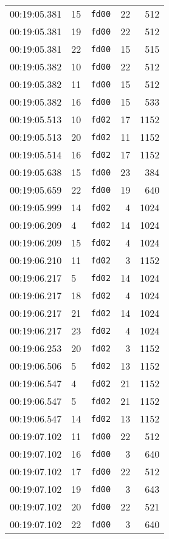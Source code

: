 \documentclass{article}
\begin{document}
\begin{longtable}{lllrr}
00:19:05.381 & 15 & \texttt{fd00} & 22 & 512 \\
00:19:05.381 & 19 & \texttt{fd00} & 22 & 512 \\
00:19:05.381 & 22 & \texttt{fd00} & 15 & 515 \\
00:19:05.382 & 10 & \texttt{fd00} & 22 & 512 \\
00:19:05.382 & 11 & \texttt{fd00} & 15 & 512 \\
00:19:05.382 & 16 & \texttt{fd00} & 15 & 533 \\
00:19:05.513 & 10 & \texttt{fd02} & 17 & 1152 \\
00:19:05.513 & 20 & \texttt{fd02} & 11 & 1152 \\
00:19:05.514 & 16 & \texttt{fd02} & 17 & 1152 \\
00:19:05.638 & 15 & \texttt{fd00} & 23 & 384 \\
00:19:05.659 & 22 & \texttt{fd00} & 19 & 640 \\
00:19:05.999 & 14 & \texttt{fd02} & 4 & 1024 \\
00:19:06.209 & 4 & \texttt{fd02} & 14 & 1024 \\
00:19:06.209 & 15 & \texttt{fd02} & 4 & 1024 \\
00:19:06.210 & 11 & \texttt{fd02} & 3 & 1152 \\
00:19:06.217 & 5 & \texttt{fd02} & 14 & 1024 \\
00:19:06.217 & 18 & \texttt{fd02} & 4 & 1024 \\
00:19:06.217 & 21 & \texttt{fd02} & 14 & 1024 \\
00:19:06.217 & 23 & \texttt{fd02} & 4 & 1024 \\
00:19:06.253 & 20 & \texttt{fd02} & 3 & 1152 \\
00:19:06.506 & 5 & \texttt{fd02} & 13 & 1152 \\
00:19:06.547 & 4 & \texttt{fd02} & 21 & 1152 \\
00:19:06.547 & 5 & \texttt{fd02} & 21 & 1152 \\
00:19:06.547 & 14 & \texttt{fd02} & 13 & 1152 \\
00:19:07.102 & 11 & \texttt{fd00} & 22 & 512 \\
00:19:07.102 & 16 & \texttt{fd00} & 3 & 640 \\
00:19:07.102 & 17 & \texttt{fd00} & 22 & 512 \\
00:19:07.102 & 19 & \texttt{fd00} & 3 & 643 \\
00:19:07.102 & 20 & \texttt{fd00} & 22 & 521 \\
00:19:07.102 & 22 & \texttt{fd00} & 3 & 640 \\

\end{longtable}
\end{document}
